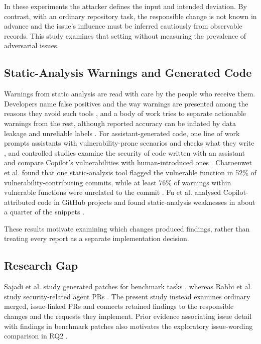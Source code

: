 \documentclass[acmsmall,screen,nonacm]{acmart}
\begin{document}
In these experiments the attacker defines the input and intended deviation. By contrast, with an ordinary repository task, the responsible change is not known in advance and the issue's influence must be inferred cautiously from observable records. This study examines that setting without measuring the prevalence of adversarial issues.

\subsection{Static-Analysis Warnings and Generated Code}

Warnings from static analysis are read with care by the people who receive them. Developers name false positives and the way warnings are presented among the reasons they avoid such tools \cite{b33}, and a body of work tries to separate actionable warnings from the rest, although reported accuracy can be inflated by data leakage and unreliable labels \cite{b34}. For assistant-generated code, one line of work prompts assistants with vulnerability-prone scenarios and checks what they write \cite{b35}, and controlled studies examine the security of code written with an assistant \cite{b41} and compare Copilot's vulnerabilities with human-introduced ones \cite{b42}. Charoenwet et al. found that one static-analysis tool flagged the vulnerable function in 52\% of vulnerability-contributing commits, while at least 76\% of warnings within vulnerable functions were unrelated to the commit \cite{b43}. Fu et al. analysed Copilot-attributed code in GitHub projects and found static-analysis weaknesses in about a quarter of the snippets \cite{b32}.

These results motivate examining which changes produced findings, rather than treating every report as a separate implementation decision.

\subsection{Research Gap}

Sajadi et al. study generated patches for benchmark tasks \cite{b36}, whereas Rabbi et al. study security-related agent PRs \cite{b37}. The present study instead examines ordinary merged, issue-linked PRs and connects retained findings to the responsible changes and the requests they implement. Prior evidence associating issue detail with findings in benchmark patches also motivates the exploratory issue-wording comparison in RQ2 \cite{b36}.
\end{document}
